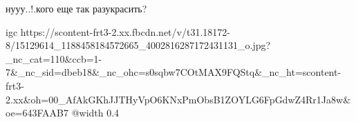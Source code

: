  
 
 
 
 

\qqSecCmt


нууу..!.кого еще так разукрасить?

\ifcmt
  igc https://scontent-frt3-2.xx.fbcdn.net/v/t31.18172-8/15129614_1188458184572665_4002816287172431131_o.jpg?_nc_cat=110&ccb=1-7&_nc_sid=dbeb18&_nc_ohc=s0sqbw7COtMAX9FQStq&_nc_ht=scontent-frt3-2.xx&oh=00_AfAkGKhJJTHyVpO6KNxPmObsB1ZOYLG6FpGdwZ4Rr1Ja8w&oe=643FAAB7
	@width 0.4
\fi

